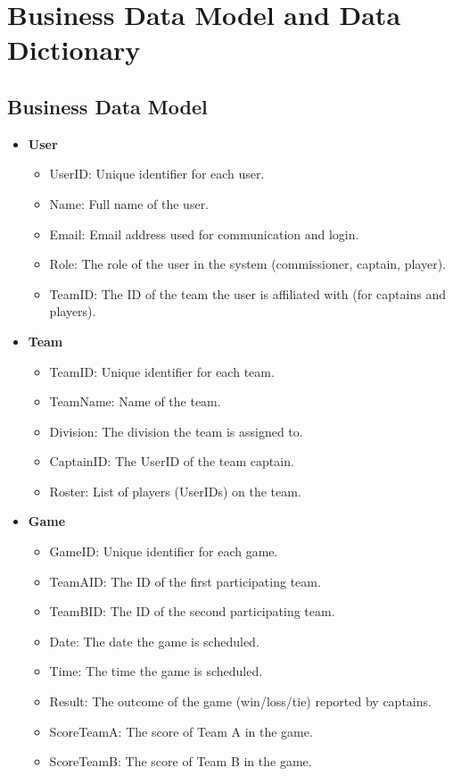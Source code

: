 \documentclass[12pt]{article}
\begin{document}
\section{Business Data Model and Data Dictionary}
\subsection{Business Data Model}
\begin{itemize}
    \item \textbf{User}
    \begin{itemize}
        \item UserID: Unique identifier for each user.
        \item Name: Full name of the user.
        \item Email: Email address used for communication and login.
        \item Role: The role of the user in the system (commissioner, captain, player).
        \item TeamID: The ID of the team the user is affiliated with (for captains and players).
    \end{itemize}
    
    \item \textbf{Team}
    \begin{itemize}
        \item TeamID: Unique identifier for each team.
        \item TeamName: Name of the team.
        \item Division: The division the team is assigned to.
        \item CaptainID: The UserID of the team captain.
        \item Roster: List of players (UserIDs) on the team.
    \end{itemize}
    
    \item \textbf{Game}
    \begin{itemize}
        \item GameID: Unique identifier for each game.
        \item TeamAID: The ID of the first participating team.
        \item TeamBID: The ID of the second participating team.
        \item Date: The date the game is scheduled.
        \item Time: The time the game is scheduled.
        \item Result: The outcome of the game (win/loss/tie) reported by captains.
        \item ScoreTeamA: The score of Team A in the game.
        \item ScoreTeamB: The score of Team B in the game.
    \end{itemize}
    

\end{itemize}
\end{document}
